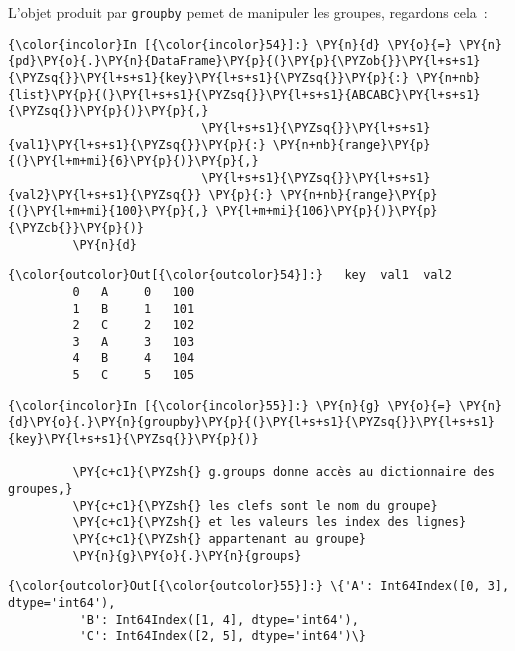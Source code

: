     L'objet produit par \texttt{groupby} pemet de manipuler les groupes,
regardons cela~:

    \begin{Verbatim}[commandchars=\\\{\}]
{\color{incolor}In [{\color{incolor}54}]:} \PY{n}{d} \PY{o}{=} \PY{n}{pd}\PY{o}{.}\PY{n}{DataFrame}\PY{p}{(}\PY{p}{\PYZob{}}\PY{l+s+s1}{\PYZsq{}}\PY{l+s+s1}{key}\PY{l+s+s1}{\PYZsq{}}\PY{p}{:} \PY{n+nb}{list}\PY{p}{(}\PY{l+s+s1}{\PYZsq{}}\PY{l+s+s1}{ABCABC}\PY{l+s+s1}{\PYZsq{}}\PY{p}{)}\PY{p}{,}
                           \PY{l+s+s1}{\PYZsq{}}\PY{l+s+s1}{val1}\PY{l+s+s1}{\PYZsq{}}\PY{p}{:} \PY{n+nb}{range}\PY{p}{(}\PY{l+m+mi}{6}\PY{p}{)}\PY{p}{,}
                           \PY{l+s+s1}{\PYZsq{}}\PY{l+s+s1}{val2}\PY{l+s+s1}{\PYZsq{}} \PY{p}{:} \PY{n+nb}{range}\PY{p}{(}\PY{l+m+mi}{100}\PY{p}{,} \PY{l+m+mi}{106}\PY{p}{)}\PY{p}{\PYZcb{}}\PY{p}{)}
         \PY{n}{d}
\end{Verbatim}


\begin{Verbatim}[commandchars=\\\{\}]
{\color{outcolor}Out[{\color{outcolor}54}]:}   key  val1  val2
         0   A     0   100
         1   B     1   101
         2   C     2   102
         3   A     3   103
         4   B     4   104
         5   C     5   105
\end{Verbatim}
            
    \begin{Verbatim}[commandchars=\\\{\}]
{\color{incolor}In [{\color{incolor}55}]:} \PY{n}{g} \PY{o}{=} \PY{n}{d}\PY{o}{.}\PY{n}{groupby}\PY{p}{(}\PY{l+s+s1}{\PYZsq{}}\PY{l+s+s1}{key}\PY{l+s+s1}{\PYZsq{}}\PY{p}{)}
         
         \PY{c+c1}{\PYZsh{} g.groups donne accès au dictionnaire des groupes,}
         \PY{c+c1}{\PYZsh{} les clefs sont le nom du groupe}
         \PY{c+c1}{\PYZsh{} et les valeurs les index des lignes}
         \PY{c+c1}{\PYZsh{} appartenant au groupe}
         \PY{n}{g}\PY{o}{.}\PY{n}{groups}
\end{Verbatim}


\begin{Verbatim}[commandchars=\\\{\}]
{\color{outcolor}Out[{\color{outcolor}55}]:} \{'A': Int64Index([0, 3], dtype='int64'),
          'B': Int64Index([1, 4], dtype='int64'),
          'C': Int64Index([2, 5], dtype='int64')\}
\end{Verbatim}
            
